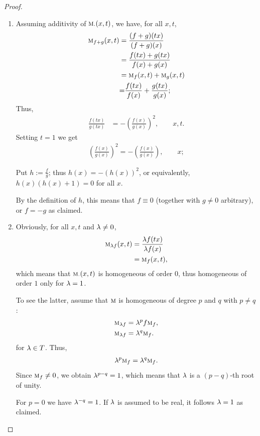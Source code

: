 \documentclass{amsart}
\makeatletter
\theoremstyle{plain}
\numberwithin{equation}{section}
\def\lambda{\Greekmath 0115 }%
\def\FindBoldGroup{%
   {\setbox0=\hbox{$\mathbf{x\global\edef\theboldgroup{\the\mathgroup}}$}}%
}
\def\Greekmath#1#2#3#4{%
    \if@compatibility
        \ifnum\mathgroup=\symbold
           \mathchoice{\mbox{\boldmath$\displaystyle\mathchar"#1#2#3#4$}}%
                      {\mbox{\boldmath$\textstyle\mathchar"#1#2#3#4$}}%
                      {\mbox{\boldmath$\scriptstyle\mathchar"#1#2#3#4$}}%
                      {\mbox{\boldmath$\scriptscriptstyle\mathchar"#1#2#3#4$}}%
        \else
           \mathchar"#1#2#3#4%
        \fi 
    \else 
        \FindBoldGroup
        \ifnum\mathgroup=\theboldgroup %
           \mathchoice{\mbox{\boldmath$\displaystyle\mathchar"#1#2#3#4$}}%
                      {\mbox{\boldmath$\textstyle\mathchar"#1#2#3#4$}}%
                      {\mbox{\boldmath$\scriptstyle\mathchar"#1#2#3#4$}}%
                      {\mbox{\boldmath$\scriptscriptstyle\mathchar"#1#2#3#4$}}%
        \else
           \mathchar"#1#2#3#4%
        \fi     	    
	  \fi}
\newcommand{\mh}{\textsc{m}}
\makeatother
\begin{document}
\begin{proof}
    
\begin{enumerate}
    \item 
Assuming additivity of $\mh_{\cdot}(x,t)$, we have, for all $x,t$,
\begin{align*}
\mh_{f+g}(x,t) &=
\frac{({f+g})(tx)}{{(f+g)(x)}}\\
&=
\frac{{f(tx)+g(tx)}}{{f(x)+g(x)}}\\
&=
\mh_{f}(x,t) + \mh_{g}(x,t)\\
&{=}
\frac{{f(tx)}}{{f(x)}} +\frac{{g(tx)}}{{g(x)}};
\end{align*}
Thus,
\begin{align*}
\frac{{f(tx)}}{{g(tx)}}
&=
-\left(\frac{{f(x)}}{{g(x)}}\right)^2, \qquad x,t.
\end{align*}
Setting $t=1$ we get
\begin{align*}
\left(\frac{f(x)}{g(x)}\right)^2 = -\left(\frac{f(x)}{g(x)}\right), \qquad x;
\end{align*}


Put $h:=\frac{{f}}{{g}}$; thus $h(x)=-(h(x))^2$,
or equivalently, $h(x) (h(x)+1)=0$ for all $x$.

By the definition of $h$, this means that $f \equiv 0$ (together with $g \neq 0$ arbitrary), or $f=-g$ as claimed.
   \item 
Obviously, for all $x,t$ and $\lambda \neq 0$,
\begin{align*}
\mh_{\lambda f}(x,t)
&=
\frac{\lambda{f(tx)}}{\lambda {f(x)}} \\
&=\mh_{f}(x,t),
\end{align*}
which means that
$\mh_{\cdot }(x,t)$ is homogeneous of order $0$,
thus homogeneous of order $1$ only for $\lambda=1$.

To see the latter, assume that $\mh$ is homogeneous of degree $p$ and $q$ with $p \neq q$: 
\begin{align*}
\mh_{ \lambda f}&=\lambda^p f\mh_{f}, \\
\mh_{ \lambda f}&=\lambda^q \mh_{f}.
\end{align*}
for $\lambda \in T$.
Thus,
\begin{align*}
\lambda^p \mh_{f}=\lambda^q \mh_{f}.
\end{align*}
Since $\mh_{f} \neq 0$, we obtain
$\lambda^{p-q} =1$,
which means that 
$\lambda$ is a $(p-q)$-th root of unity.

For $p=0$
we have $\lambda^{-q} =1$.
If $\lambda$ is assumed to be real, it follows
$\lambda =1$ as claimed.





\end{enumerate}
\end{proof}
\end{document}
